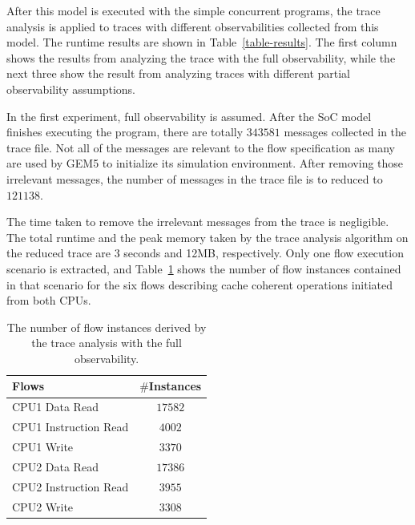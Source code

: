 \documentclass[12pt,frontmatter,copyright,thesis]{usfmanus}
\begin{document}
After this model is executed with the simple concurrent programs, 
the trace analysis is applied to traces with different observabilities
collected from this model.  The runtime results are shown in Table~\ref{table-results}.
The first column shows the results from analyzing the trace with the full
observability, while the next three show the result from 
analyzing traces with different partial observability assumptions.

In the first experiment, full observability is assumed.
After the SoC model finishes executing the program, there
are totally $343581$ messages collected in the trace file.
Not all of the messages are relevant to the flow
specification as many are used by GEM5 to initialize its
simulation environment.  After removing those irrelevant
messages, the number of messages in the trace file is to
reduced to $121138$.

The time taken to remove the irrelevant messages from the
trace is negligible.  The total runtime and the peak memory
taken by the trace analysis algorithm on the reduced
trace are 3 seconds and 12MB, respectively.  Only one flow execution
scenario is extracted, and 
Table~\ref{table-case-2} shows the number of flow instances contained in that
scenario for the six 
flows describing cache coherent operations initiated from both CPUs.
\begin{table}[tb]
\caption{The number of flow instances derived by the trace analysis with the full observability.}
\begin{center}
\begin{tabular}{|l|c|}
\hline
Flows & $\#$Instances \\
\hline
\hline
CPU1 Data Read			&  $17582$\\
CPU1 Instruction Read		&  $4002$\\
CPU1 Write				&  $3370$\\
\hline
CPU2 Data Read			&  $17386$\\
CPU2 Instruction Read		&  $3955$\\
CPU2 Write				&  $3308$\\
\hline
\end{tabular}
\end{center}
\label{table-case-2}
\end{table}%
\end{document}

